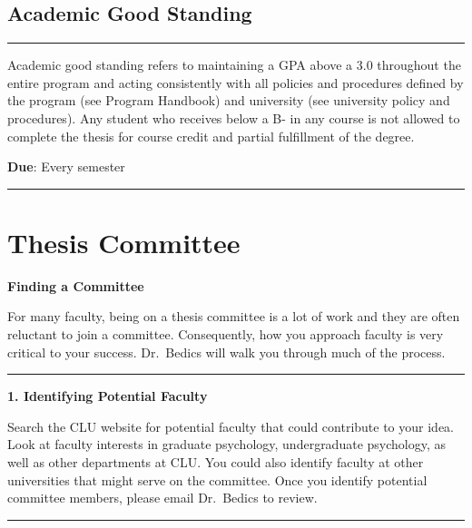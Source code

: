 \documentclass[openany]{book}
\begin{document}
\hypertarget{academic-good-standing}{%
\section{Academic Good Standing}\label{academic-good-standing}}

\begin{center}\rule{0.5\linewidth}{0.5pt}\end{center}

Academic good standing refers to maintaining a GPA above a 3.0 throughout the entire program and acting consistently with all policies and procedures defined by the program (see Program Handbook) and university (see university policy and procedures). Any student who receives below a B- in any course is not allowed to complete the thesis for course credit and partial fulfillment of the degree.

\textbf{Due}: Every semester

\begin{center}\rule{0.5\linewidth}{0.5pt}\end{center}

\hypertarget{thesis-committee}{%
\chapter{Thesis Committee}\label{thesis-committee}}

\textbf{Finding a Committee}

For many faculty, being on a thesis committee is a lot of work and they are often reluctant to join a committee. Consequently, how you approach faculty is very critical to your success. Dr.~Bedics will walk you through much of the process.

\begin{center}\rule{0.5\linewidth}{0.5pt}\end{center}

\textbf{1. Identifying Potential Faculty}

Search the CLU website for potential faculty that could contribute to your idea. Look at faculty interests in graduate psychology, undergraduate psychology, as well as other departments at CLU. You could also identify faculty at other universities that might serve on the committee. Once you identify potential committee members, please email Dr.~Bedics to review.

\begin{center}\rule{0.5\linewidth}{0.5pt}\end{center}
\end{document}
